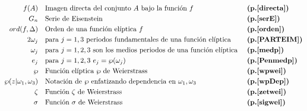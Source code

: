 \documentclass[spanish, openright,oneside]{book}
\theoremstyle{definition}
\begin{document}
\begin{align*}
f(A)\ \ \ & \text{Imagen directa del conjunto $A$ bajo la función $f$}   & & \text{\textbf{(p.\pageref{directa})}}\\
G_n \ \ \ & \text{Serie de Eisenstein}   & & \text{\textbf{(p.\pageref{serE})}}\\
ord(f,\Delta)\ \ \ & \text{Orden de una función elíptica $f$}   & & \text{\textbf{(p.\pageref{orden})}}\\
2\omega_j \ \ \ & \text{para $j=1,3$ periodos fundamentales de una función elíptica } & & \text{\textbf{(p.\pageref{PARTEIM})}}\\
\omega_j \ \ \ & \text{para $j=1,2,3$ son los medios periodos de una función elíptica } & & \text{\textbf{(p.\pageref{medp})}}\\
e_j \ \ \ & \text{para $j=1,2,3$ $e_j=\wp(\omega_j)$ } & & \text{\textbf{(p.\pageref{Penmedp})}}\\
\wp \ \ \ & \text{Función elíptica $\wp$ de Weierstrass}   & & \text{\textbf{(p.\pageref{wpwei})}}\\
\wp(z | \omega_1, \omega_3 ) \ \ \ & \text{Notación de $\wp$ enfatizando dependencia en $\omega_1, \omega_3$}   & & \text{\textbf{(p.\pageref{wpDep})}}\\
\zeta \ \ \ & \text{Función $\zeta$ de Weierstrass}   & & \text{\textbf{(p.\pageref{zetwei})}}\\
\sigma \ \ \ & \text{Función $\sigma$ de Weierstrass}   & & \text{\textbf{(p.\pageref{sigwei})}}\\
\end{align*}
\end{document}
